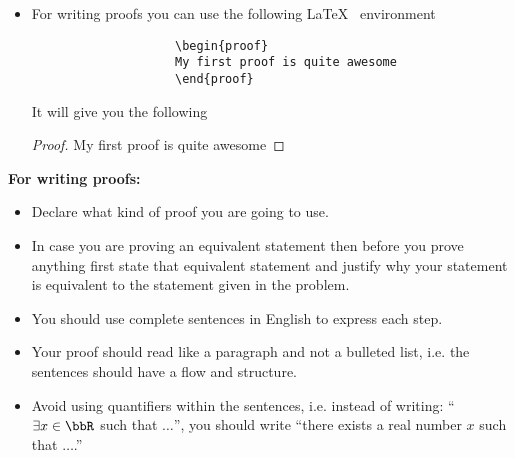 \documentclass[11pt]{article}
\begin{document}
\begin{itemize}
\begin{itemize}
    \item For writing proofs you can use the following \LaTeX~ environment
                {\blue
                \begin{verbatim}
                    \begin{proof}
                    My first proof is quite awesome
                    \end{proof}
                \end{verbatim}
                }
                It will give you the following
                \begin{proof}
                 My first proof is quite awesome
                \end{proof}
        \end{itemize}
\end{itemize}
\newpage
\begin{center}
\textbf{\blue For writing proofs:}
\end{center}
\begin{itemize}
    \item Declare what kind of proof you are going to use.
    \item In case you are proving an equivalent statement then before you prove anything first state that equivalent statement and justify why your statement is equivalent to the statement given in the problem.
    \item You should use complete sentences in English to express each step.
    \item Your proof should read like a paragraph and not a bulleted list, i.e. the sentences should have a flow and structure.
    \item Avoid using quantifiers within the sentences, i.e. instead of writing: ``$\exists x \in \bbR$ such that $\ldots$'', you should write ``there exists a real number $x$ such that $\ldots$.''
\end{itemize}
\newpage

\maketitle
\end{document}

